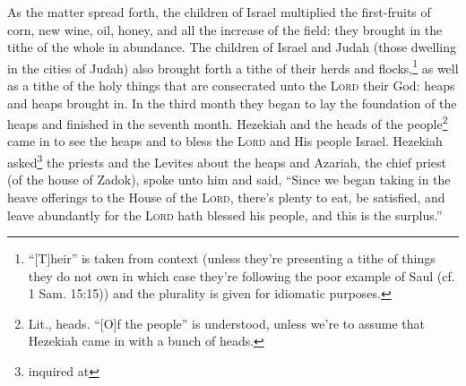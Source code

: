 

\begin{enumerate*}[mode=unboxed]
     As the matter spread forth, the children of Israel multiplied the first-fruits of corn, new wine, oil, honey, and all the increase of the field: they brought in the tithe of the whole in abundance.%
     The children of Israel and Judah (those dwelling in the cities of Judah) also brought forth a tithe of their herds and flocks,\footnote{``[T]heir'' is taken from context (unless they're presenting a tithe of things they do not own in which case they're following the poor example of Saul (cf. 1 Sam. 15:15)) and the plurality is given for idiomatic purposes.} as well as a tithe of the holy things that are consecrated unto the \textsc{Lord} their God: heaps and heaps brought in.%
     In the third month they began to lay the foundation of the heaps and finished in the seventh month.%
     Hezekiah and the heads of the people\footnote{Lit., heads. ``[O]f the people'' is understood, unless we're to assume that Hezekiah came in with a bunch of heads.} came in to see the heaps and to bless the \textsc{Lord} and His people Israel.%
     Hezekiah asked\footnote{inquired at} the priests and the Levites about the heaps%
     and Azariah, the chief priest (of the house of Zadok), spoke unto him and said, ``Since we began taking in the heave offerings to the House of the \textsc{Lord}, there's plenty to eat, be satisfied, and leave abundantly for the \textsc{Lord} hath blessed his people, and this is the surplus.''%
\end{enumerate*}
